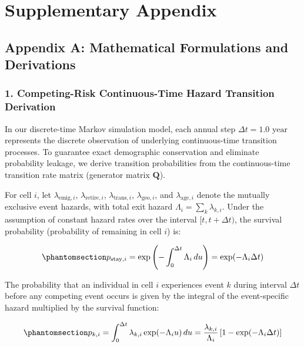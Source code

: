 \documentclass[
  11pt,
  a4paper]{article}
\begin{document}
\section{Supplementary Appendix}\label{sec-appendix}

\subsection{Appendix A: Mathematical Formulations and
Derivations}\label{sec-app-math}

\subsubsection{1. Competing-Risk Continuous-Time Hazard Transition
Derivation}\label{competing-risk-continuous-time-hazard-transition-derivation}

In our discrete-time Markov simulation model, each annual step
\(\Delta t = 1.0\text{ year}\) represents the discrete observation of
underlying continuous-time transition processes. To guarantee exact
demographic conservation and eliminate probability leakage, we derive
transition probabilities from the continuous-time transition rate matrix
(generator matrix \(\mathbf{Q}\)).

For cell \(i\), let \(\lambda_{\text{emig}, i}\),
\(\lambda_{\text{retire}, i}\), \(\lambda_{\text{trans}, i}\),
\(\lambda_{\text{geo}, i}\), and \(\lambda_{\text{age}, i}\) denote the
mutually exclusive event hazards, with total exit hazard
\(\Lambda_i = \sum_{k} \lambda_{k, i}\). Under the assumption of
constant hazard rates over the interval \([t, t + \Delta t)\), the
survival probability (probability of remaining in cell \(i\)) is:

\begin{equation}\protect\phantomsection\label{eq-app-stay}{p_{\text{stay}, i} = \exp\left( -\int_{0}^{\Delta t} \Lambda_i \, du \right) = \exp(-\Lambda_i \Delta t)}\end{equation}

The probability that an individual in cell \(i\) experiences event \(k\)
during interval \(\Delta t\) before any competing event occurs is given
by the integral of the event-specific hazard multiplied by the survival
function:

\begin{equation}\protect\phantomsection\label{eq-app-event}{p_{k, i} = \int_{0}^{\Delta t} \lambda_{k, i} \exp(-\Lambda_i u) \, du = \frac{\lambda_{k, i}}{\Lambda_i} \left[ 1 - \exp(-\Lambda_i \Delta t) \right]}\end{equation}
\end{document}

